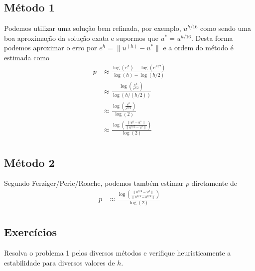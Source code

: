 \subsection{Método 1}
Podemos utilizar uma solução bem refinada, por exemplo, $u^{h/16}$ como sendo uma boa aproximação da solução exata e supormos que $u^*=u^{h/16}$. Desta forma podemos aproximar o erro por $e^{h}=\|u^{(h)}-u^*\|$ e a ordem do método é estimada como
\begin{eqnarray}
  p  & \approx  \frac{ \log(e^{h})-\log(e^{h/2})}{\log(h)-\log(h/2)} \\
     & \approx  \frac{ \log \left(   \frac{e^{h}}{e^{h/2}} \right)  }{\log(h /(h/2))} \\
     & \approx  \frac{ \log \left(   \frac{e^{h}}{e^{h/2}} \right)  }{\log(2)} \\
     & \approx  \frac{ \log \left(   \frac{\|u^{h}-u^*\|}{\|u^{h/2}-u^*\|} \right)  }{\log(2)} \\
\end{eqnarray}

\subsection{Método 2}
Segundo Ferziger/Peric/Roache, podemos também estimar $p$ diretamente de
\begin{eqnarray}
  p  & \approx  \frac{ \log \left(   \frac{\|u^{h/2}-u^{h}\|}{\|u^{h/4}-u^{h/2}\|} \right)  }{\log(2)} \\
\end{eqnarray}













\subsection*{Exercícios}

\begin{exer} Resolva o problema 1 pelos diversos métodos e verifique heuristicamente a estabilidade para diversos valores de $h$.
\end{exer}












